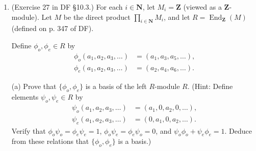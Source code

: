 \documentclass[10pt]{article}
\DeclareMathOperator*{\End}{End}
\begin{document}
\begin{enumerate}
\begin{proof}
\begin{comment}
Let $i \in I$, and let $\iota: M_i \rightarrow M$ be the natural inclusion of $M_i$ into $M$, i.e.
$$
\iota(m) = \prod_{j \in I} m_j
$$
$$
m_j =
\begin{cases}
0 & j \neq i \\
m & j = i
\end{cases}.
$$
We will now show that the set $\overline{A_i} = \iota(A) = \{\iota(a):a \in A \}$, where $\iota(a) = \prod_{j \in I} a_j$ for $a_j = a$ if $j = i$ and $a_j = 0$ otherwise, forms a basis for the submodule $\overline{M_i} = \iota(M_i) \subseteq M$.  Any element $m \in \overline{M_i}$ is of the form $\prod_{j \in I} m_j$, where $m_j = m$ if $j = i$ and $0$ otherwise.  We know $m_j$ has a unique representation of the form $r_1a_1 + \cdots + r_na_n$ for some $r_1, \dots , r_n \in R$, $a_1, \dots , a_n \in A_i$.  Thus $m$ has a unique representation of the form
$$
m = \prod_{j \in I} m_j = r_1 \iota(a_1) + \cdots + r_n \iota(a_n)
$$
$$
m_j =
\begin{cases}
0 & j \neq i \\
r_1a_1 + \cdots + r_na_n & j = i
\end{cases}
$$
by the componentwise definition in $M$ of addition and multiplication by element of $R$.
\end{comment}

\end{proof}

\item (Exercise 27 in DF \S 10.3.) For each $i \in \mathbf{N}$, let $M_i = \mathbf{Z}$ (viewed as a $\mathbf{Z}$-module).  Let $M$ be the direct product $\prod_{i \in \mathbf{N}} M_i$, and let $R = \End_\mathbf{Z}(M)$ (defined on p. 347 of DF).

Define $\phi_o, \phi_e \in R$ by
\begin{align*}
\phi_o(a_1,a_2,a_3,\ldots) &= (a_1,a_3,a_5,\ldots) \text{,}
\\
\phi_e(a_1,a_2,a_3,\ldots) &= (a_2,a_4,a_6,\ldots) \text{.}
\end{align*}

(a) Prove that $\{\phi_o,\phi_e\}$ is a basis of the left $R$-module $R$.  (Hint: Define elements $\psi_o, \psi_e \in R$ by 
\begin{align*}
\psi_o(a_1,a_2,a_3,\ldots) &= (a_1,0,a_2,0,\ldots) \text{,}
\\
\psi_e(a_1,a_2,a_3,\ldots) &= (0,a_1,0,a_2,\ldots) \text{.}
\end{align*}
Verify that $\phi_o \psi_o = \phi_e \psi_e = 1$, $\phi_o \psi_e = \phi_e \psi_o = 0$, and $\psi_o \phi_o + \psi_e \phi_e = 1$.  Deduce from these relations that $\{\phi_o,\phi_e\}$ is a basis.)


\end{enumerate}
\end{document}
